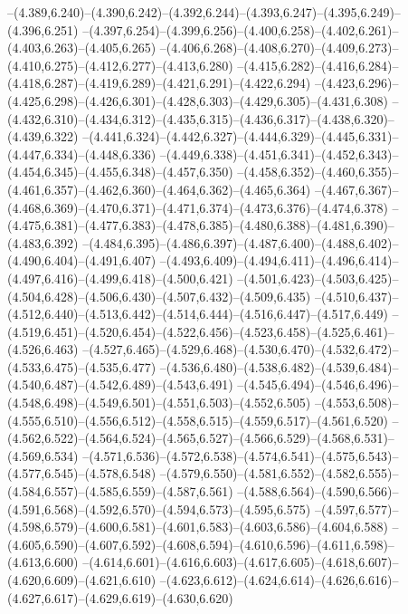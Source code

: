  --(4.389,6.240)--(4.390,6.242)--(4.392,6.244)--(4.393,6.247)--(4.395,6.249)--(4.396,6.251)%
  --(4.397,6.254)--(4.399,6.256)--(4.400,6.258)--(4.402,6.261)--(4.403,6.263)--(4.405,6.265)%
  --(4.406,6.268)--(4.408,6.270)--(4.409,6.273)--(4.410,6.275)--(4.412,6.277)--(4.413,6.280)%
  --(4.415,6.282)--(4.416,6.284)--(4.418,6.287)--(4.419,6.289)--(4.421,6.291)--(4.422,6.294)%
  --(4.423,6.296)--(4.425,6.298)--(4.426,6.301)--(4.428,6.303)--(4.429,6.305)--(4.431,6.308)%
  --(4.432,6.310)--(4.434,6.312)--(4.435,6.315)--(4.436,6.317)--(4.438,6.320)--(4.439,6.322)%
  --(4.441,6.324)--(4.442,6.327)--(4.444,6.329)--(4.445,6.331)--(4.447,6.334)--(4.448,6.336)%
  --(4.449,6.338)--(4.451,6.341)--(4.452,6.343)--(4.454,6.345)--(4.455,6.348)--(4.457,6.350)%
  --(4.458,6.352)--(4.460,6.355)--(4.461,6.357)--(4.462,6.360)--(4.464,6.362)--(4.465,6.364)%
  --(4.467,6.367)--(4.468,6.369)--(4.470,6.371)--(4.471,6.374)--(4.473,6.376)--(4.474,6.378)%
  --(4.475,6.381)--(4.477,6.383)--(4.478,6.385)--(4.480,6.388)--(4.481,6.390)--(4.483,6.392)%
  --(4.484,6.395)--(4.486,6.397)--(4.487,6.400)--(4.488,6.402)--(4.490,6.404)--(4.491,6.407)%
  --(4.493,6.409)--(4.494,6.411)--(4.496,6.414)--(4.497,6.416)--(4.499,6.418)--(4.500,6.421)%
  --(4.501,6.423)--(4.503,6.425)--(4.504,6.428)--(4.506,6.430)--(4.507,6.432)--(4.509,6.435)%
  --(4.510,6.437)--(4.512,6.440)--(4.513,6.442)--(4.514,6.444)--(4.516,6.447)--(4.517,6.449)%
  --(4.519,6.451)--(4.520,6.454)--(4.522,6.456)--(4.523,6.458)--(4.525,6.461)--(4.526,6.463)%
  --(4.527,6.465)--(4.529,6.468)--(4.530,6.470)--(4.532,6.472)--(4.533,6.475)--(4.535,6.477)%
  --(4.536,6.480)--(4.538,6.482)--(4.539,6.484)--(4.540,6.487)--(4.542,6.489)--(4.543,6.491)%
  --(4.545,6.494)--(4.546,6.496)--(4.548,6.498)--(4.549,6.501)--(4.551,6.503)--(4.552,6.505)%
  --(4.553,6.508)--(4.555,6.510)--(4.556,6.512)--(4.558,6.515)--(4.559,6.517)--(4.561,6.520)%
  --(4.562,6.522)--(4.564,6.524)--(4.565,6.527)--(4.566,6.529)--(4.568,6.531)--(4.569,6.534)%
  --(4.571,6.536)--(4.572,6.538)--(4.574,6.541)--(4.575,6.543)--(4.577,6.545)--(4.578,6.548)%
  --(4.579,6.550)--(4.581,6.552)--(4.582,6.555)--(4.584,6.557)--(4.585,6.559)--(4.587,6.561)%
  --(4.588,6.564)--(4.590,6.566)--(4.591,6.568)--(4.592,6.570)--(4.594,6.573)--(4.595,6.575)%
  --(4.597,6.577)--(4.598,6.579)--(4.600,6.581)--(4.601,6.583)--(4.603,6.586)--(4.604,6.588)%
  --(4.605,6.590)--(4.607,6.592)--(4.608,6.594)--(4.610,6.596)--(4.611,6.598)--(4.613,6.600)%
  --(4.614,6.601)--(4.616,6.603)--(4.617,6.605)--(4.618,6.607)--(4.620,6.609)--(4.621,6.610)%
  --(4.623,6.612)--(4.624,6.614)--(4.626,6.616)--(4.627,6.617)--(4.629,6.619)--(4.630,6.620)%
